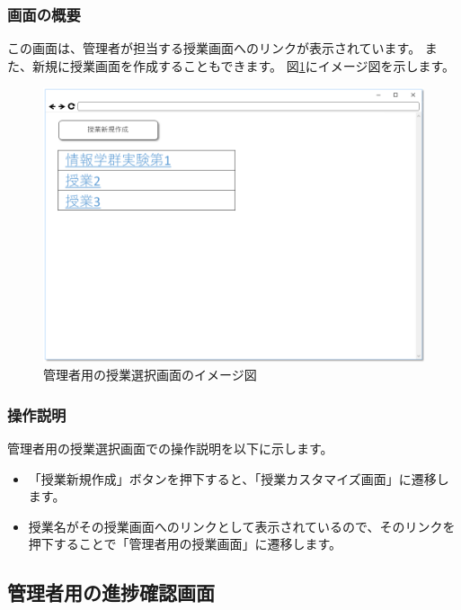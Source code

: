 \subsubsection{画面の概要}
この画面は、管理者が担当する授業画面へのリンクが表示されています。
また、新規に授業画面を作成することもできます。
図\ref{fig:sc_select_class}にイメージ図を示します。

\begin{figure}[htbp]
  \begin{center}
    \includegraphics[width=1\linewidth,clip]{./img/sc_select_class.png}
    \caption{管理者用の授業選択画面のイメージ図}\label{fig:sc_select_class}
  \end{center}
\end{figure}

\subsubsection{操作説明}
管理者用の授業選択画面での操作説明を以下に示します。
\begin{itemize}
\item 「授業新規作成」ボタンを押下すると、「授業カスタマイズ画面」に遷移します。
\item 授業名がその授業画面へのリンクとして表示されているので、そのリンクを押下することで「管理者用の授業画面」に遷移します。
\end{itemize}

\subsection{管理者用の進捗確認画面}
